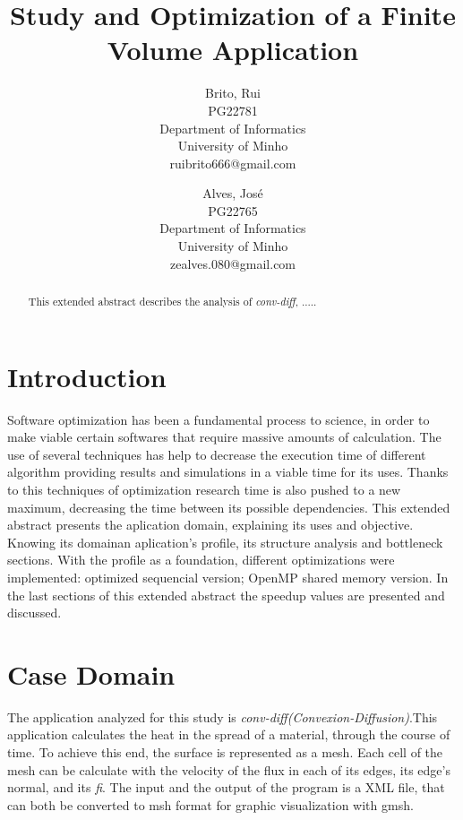 \documentclass[a4paper,10pt,openright,openbib,twocolumn]{article}
\begin{document}
\begin{multicols}{2}
\title{Study and Optimization of a Finite Volume Application}
\author{
    Brito, Rui\\
    PG22781\\
    Department of Informatics\\
    University of Minho\\
    ruibrito666@gmail.com
  \and
    Alves, José\\
    PG22765\\
    Department of Informatics\\
    University of Minho\\
    zealves.080@gmail.com
}
\date{}
\maketitle
\end{multicols}

\begin{abstract}
    This extended abstract describes the analysis of \emph{conv-diff}, ..... 
\end{abstract}

\section{Introduction}

Software optimization has been a fundamental process to science, in order to make viable certain softwares that require massive amounts of calculation. The use of several techniques has help to decrease the execution time of different algorithm providing results and simulations in a viable time for its uses. Thanks to this techniques of optimization research time is also pushed to a new maximum, decreasing the time between its possible dependencies.
This extended abstract presents the aplication domain, explaining its uses and objective. Knowing its domainan aplication's profile, its structure analysis and bottleneck sections. With the profile as a foundation,  different optimizations were implemented: optimized sequencial version; OpenMP shared memory version. In the last sections of this extended abstract the speedup values are presented and discussed.

\section{Case Domain}

The application analyzed for this study is \emph{conv-diff(Convexion-Diffusion)}.This application calculates the heat in the spread of a material, through the course of time. To achieve this end, the surface is represented as a mesh. Each cell of the mesh can be calculate with the velocity of the flux in each of its edges, its edge's normal, and its \emph{fi}.
The input and the output of the program is a XML file, that can both be converted to msh format for graphic visualization with gmsh.
\end{document}
